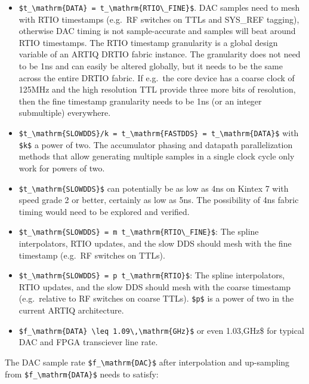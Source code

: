 \begin{itemize}
	\item
	\texttt{\$t\_\textbackslash{}mathrm\{DATA\}\ =\ t\_\textbackslash{}mathrm\{RTIO\textbackslash{}\_FINE\}\$}.
	DAC samples need to mesh with RTIO timestamps (e.g.~RF switches on
	TTLs and SYS\_REF tagging), otherwise DAC timing is not
	sample-accurate and samples will beat around RTIO timestamps. The RTIO
	timestamp granularity is a global design variable of an ARTIQ DRTIO
	fabric instance. The granularity does not need to be 1ns and can
	easily be altered globally, but it needs to be the same across the
	entire DRTIO fabric. If e.g.~the core device has a coarse clock of
	125MHz and the high resolution TTL provide three more bits of
	resolution, then the fine timestamp granularity needs to be 1ns (or an
	integer submultiple) everywhere.
	\item
	\texttt{\$t\_\textbackslash{}mathrm\{SLOWDDS\}/k\ =\ t\_\textbackslash{}mathrm\{FASTDDS\}\ =\ t\_\textbackslash{}mathrm\{DATA\}\$}
	with \texttt{\$k\$} a power of two. The accumulator phasing and
	datapath parallelization methods that allow generating multiple
	samples in a single clock cycle only work for powers of two.
	\item
	\texttt{\$t\_\textbackslash{}mathrm\{SLOWDDS\}\$} can potentially be
	as low as 4ns on Kintex 7 with speed grade 2 or better, certainly as
	low as 5ns. The possibility of 4ns fabric timing would need to be
	explored and verified.
	\item
	\texttt{\$t\_\textbackslash{}mathrm\{SLOWDDS\}\ =\ m\ t\_\textbackslash{}mathrm\{RTIO\textbackslash{}\_FINE\}\$}:
	The spline interpolators, RTIO updates, and the slow DDS should mesh
	with the fine timestamp (e.g.~RF switches on TTLs).
	\item
	\texttt{\$t\_\textbackslash{}mathrm\{SLOWDDS\}\ =\ p\ t\_\textbackslash{}mathrm\{RTIO\}\$}:
	The spline interpolators, RTIO updates, and the slow DDS should mesh
	with the coarse timestamp (e.g.~relative to RF switches on coarse
	TTLs). \texttt{\$p\$} is a power of two in the current ARTIQ
	architecture.
	\item
	\texttt{\$f\_\textbackslash{}mathrm\{DATA\}\ \textbackslash{}leq\ 1.09\textbackslash{},\textbackslash{}mathrm\{GHz\}\$}
	or even  1.03,{GHz}\$ for typical DAC and FPGA transciever line rate.
\end{itemize}

The DAC sample rate \texttt{\$f\_\textbackslash{}mathrm\{DAC\}\$} after
interpolation and up-sampling from
\texttt{\$f\_\textbackslash{}mathrm\{DATA\}\$} needs to satisfy:

